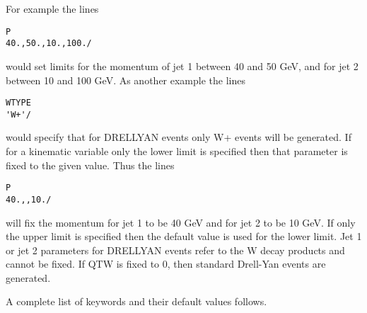       For example the lines
\begin{verbatim}
P
40.,50.,10.,100./
\end{verbatim}
would set limits for the momentum of jet 1 between 40 and 50 GeV, and
for jet 2 between 10 and 100 GeV. As another example the lines
\begin{verbatim}
WTYPE
'W+'/
\end{verbatim}
would specify that for DRELLYAN events only W+ events will be generated.
If for a kinematic variable only the lower limit is specified then that
parameter is fixed to the given value. Thus the lines
\begin{verbatim}
P
40.,,10./
\end{verbatim}
will fix the momentum for jet 1 to be 40 GeV and for jet 2 to be 10
GeV. If only the upper limit is specified then the default value is used
for the lower limit. Jet 1 or jet 2 parameters for DRELLYAN events refer
to the W decay products and cannot be fixed. If QTW is fixed to 0, then
standard Drell-Yan events are generated.

      A complete list of keywords and their default values follows.

